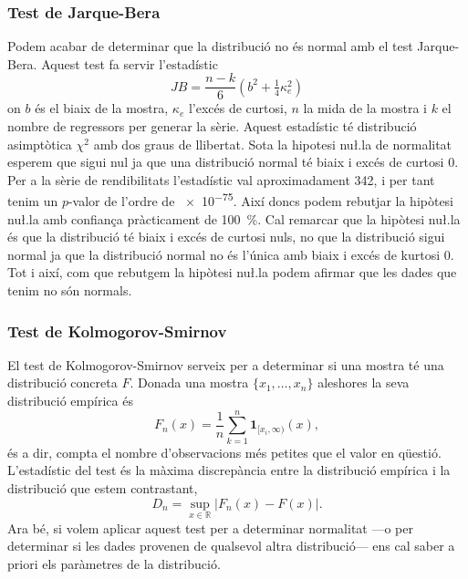 \documentclass{article}
\numberwithin{table}{section}
\numberwithin{figure}{section}
\numberwithin{equation}{section}
\newcommand{\ind}{\ensuremath{\mathbf{1}}}
\newcommand{\R}{\ensuremath{\mathbb{R}}}
\newcommand{\abs}[1]{\ensuremath{\left\lvert #1 \right\rvert}}
\begin{document}
\subsubsection{Test de Jarque-Bera}
Podem acabar de determinar que la distribució no és normal amb el test Jarque-Bera. Aquest test fa servir l'estadístic
\begin{equation} \label{eqn:jarque-bera}
	JB = \frac{n-k}{6}\left(b^2 + \tfrac{1}{4}\kappa_e^2\right)
\end{equation}
on \( b \) és el biaix de la mostra, \( \kappa_e \) l'excés de curtosi, \( n \) la mida de la mostra i \( k \) el nombre de regressors per generar la sèrie. Aquest estadístic té distribució asimptòtica \( \chi^2 \) amb dos graus de llibertat. Sota la hipotesi nu\l.la de normalitat esperem que sigui nul ja que una distribució normal té biaix i excés de curtosi 0. Per a la sèrie de rendibilitats l'estadístic val aproximadament \num{342}, i per tant tenim un \( p \)-valor de l'ordre de \num{e-75}. Així doncs podem rebutjar la hipòtesi nu\l.la amb confiança pràcticament de \SI{100}{\percent}. Cal remarcar que la hipòtesi nu\l.la és que la distribució té biaix i excés de curtosi nuls, no que la distribució sigui normal ja que la distribució normal no és l'única amb biaix i excés de kurtosi 0. Tot i així, com que rebutgem la hipòtesi nu\l.la podem afirmar que les dades que tenim no són normals. 

\subsubsection{Test de Kolmogorov-Smirnov}
El test de Kolmogorov-Smirnov serveix per a determinar si una mostra té una distribució concreta \( F \). Donada una mostra \( \{x_1, \dots, x_n \} \) aleshores la seva distribució empírica és
\begin{equation*}
	F_n(x) = \frac{1}{n} \sum_{k = 1}^{n} \ind_{[x_i, \infty)}(x),
\end{equation*}
és a dir, compta el nombre d'observacions més petites que el valor en qüestió. L'estadístic del test és la màxima discrepància entre la distribució empírica i la distribució que estem contrastant,
\begin{equation*}
	D_n = \sup_{x \in \R} \abs{F_n(x) - F(x)}.
\end{equation*}
Ara bé, si volem aplicar aquest test per a determinar normalitat ---o per determinar si les dades provenen de qualsevol altra distribució--- ens cal saber a priori els paràmetres de la distribució. 
\end{document}
